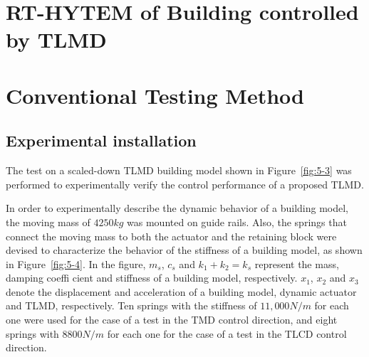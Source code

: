
\section{RT-HYTEM of Building controlled by TLMD}
\section{Conventional Testing Method}
\subsection{Experimental installation}

The test on a scaled-down TLMD building model shown in Figure~\ref{fig:5-3} was performed to experimentally verify the control performance of a proposed TLMD.

In order to experimentally describe the dynamic behavior of a building model, the moving mass of $4250 kg$ was mounted on guide rails. Also, the springs that connect the moving mass to both the actuator and the retaining block were devised to characterize the behavior of the stiffness of a building model, as shown in Figure~\ref{fig:5-4}. In the figure, $m_{s}$, $c_{s}$ and $k_{1} + k_{2} = k_{s}$ represent the mass, damping coeffi cient and stiffness of a building model, respectively. $x_{1}$, $x_{2}$ and $x_{3}$ denote the displacement and acceleration of a building model, dynamic actuator and TLMD, respectively. Ten springs with the stiffness of $11,000 N/m$ for each one were used for the case of a test in the TMD control direction, and eight springs with $8800 N/m$ for each one for the case of a test in the TLCD control direction.


